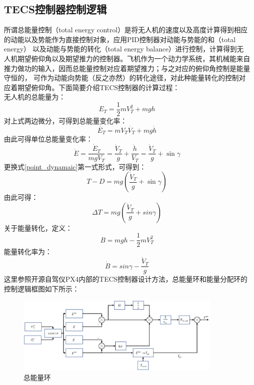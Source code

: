 \subsection{TECS控制器控制逻辑}
所谓总能量控制（total energy control）是将无人机的速度以及高度计算得到相应的动能以及势能作为直接控制对象，应用PID控制器对动能与势能的和（total energy）
以及动能与势能的转化（total energy balance）进行控制，计算得到无人机期望俯仰角以及期望推力的控制器。飞机作为一个动力学系统，其机械能来自推力做功的输入，因而总能量控制对应着期望推力；与之对应的俯仰角控制是能量守恒的，
可作为动能向势能（反之亦然）的转化途径，对此种能量转化的控制对应着期望俯仰角。下面简要介绍TECS控制器的计算过程：
\\
无人机的总能量为：
\begin{equation}
    E_T=\frac{1}{2}mV_T^2+mgh
    \label{ET}
\end{equation}
对上式两边微分，可得到总能量变化率：
\begin{equation}
    \dot{E_T}=mV_T\dot{V_T}+mg\dot{h}
    \label{ET_rate}
\end{equation}
由此可得单位总能量变化率：
\begin{equation}
    \dot{E}=\frac{\dot{E}_{T}}{m g V_{T}}=\frac{\dot{V}_{T}}{g}+\frac{\dot{h}}{V_{T}}=\frac{\dot{V}_{T}}{g}+\sin \gamma
    \label{specif_ET_rate}
\end{equation}
更换式\ref{point_dynamaic}第一式形式，可得到：
\begin{equation}
    T-D=m g\left(\frac{\dot{V}_{T}}{g}+\sin \gamma\right)
    \label{point_dynamaic_change}
\end{equation}
由此可得：
\begin{equation}
    \Delta T=m g\left(\frac{\dot{V}_{T}}{g}+sin\gamma\right)
    \label{thrust}
\end{equation}
关于能量转化，定义：
\begin{equation}
    B=m g h-\frac{1}{2} m V_{T}^{2}
\end{equation}
能量转化率为：
\begin{equation}
\dot{B}=sin\gamma-\frac{\dot{V}_{T}}{g}
\end{equation}
这里参照开源自驾仪PX4内部的TECS控制器设计方法，总能量环和能量分配环的控制逻辑框图如下所示：
\begin{figure}[H]
    \centering
    \includegraphics[width=0.9\textwidth]{figures/c3/TECS_throttle.jpg}
    \caption{总能量环}\label{fig:total_energy}
\end{figure}
